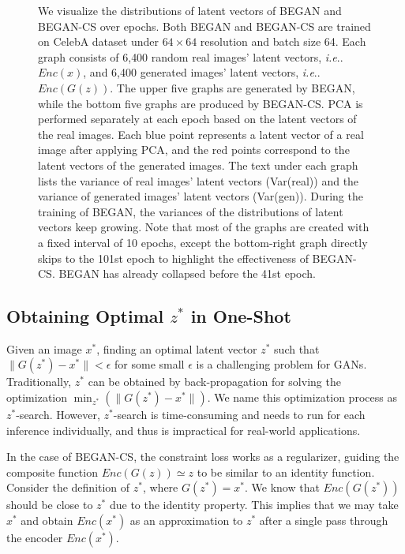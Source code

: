 \documentclass[runningheads]{llncs}
\makeatletter
\DeclareRobustCommand\onedot{\futurelet\@let@token\@onedot}
\def\@onedot{\ifx\@let@token.\else.\null\fi\xspace}
\def\ie{\emph{i.e}\onedot} \def\Ie{\emph{I.e}\onedot}
\makeatother
\begin{document}
\begin{figure}[!b]
{        }
        
        \caption{We visualize the distributions of latent vectors of BEGAN and BEGAN-CS over epochs. Both BEGAN and BEGAN-CS are trained on CelebA dataset under $64 \times 64$ resolution and batch size 64. Each graph consists of 6{,}400 random real images' latent vectors, \ie $Enc(x)$, and 6{,}400 generated images' latent vectors, \ie $Enc(G(z))$. The upper five graphs are generated by BEGAN, while the bottom five graphs are produced by BEGAN-CS. PCA is performed separately at each epoch based on the latent vectors of the real images. Each blue point represents a latent vector of a real image after applying PCA, and the red points correspond to the latent vectors of the generated images. The text under each graph lists the variance of real images' latent vectors (Var(real)) and the variance of generated images' latent vectors (Var(gen)). During the training of BEGAN, the variances of the distributions of latent vectors keep growing. Note that most of the graphs are created with a fixed interval of 10 epochs, except the bottom-right graph directly skips to the 101st epoch to highlight the effectiveness of BEGAN-CS. BEGAN has already collapsed before the 41st epoch.}\label{fig:PCA-analysis}
    \end{figure}   
   
    
    \subsection{Obtaining Optimal $z^*$ in One-Shot}
    \label{subsection:obtain-z-in-one-shot}
    
    Given an image $x^*$, finding an optimal latent vector $z^*$ such that $\lVert G(z^*)- x^* \rVert < \epsilon$ for some small $\epsilon$ is a challenging problem for GANs. Traditionally, $z^*$ can be obtained by back-propagation for solving the optimization $\displaystyle \min_{z^*} (\lVert G(z^*) - x^* \rVert)$. We name this optimization process as $z^*$-search. However, $z^*$-search is  time-consuming and needs to run for each inference individually, and thus is impractical for real-world applications.
    
    In the case of BEGAN-CS, the constraint loss works as a regularizer, guiding the composite function $Enc(G(z)) \simeq z$ to be similar to an identity function.
    Consider the definition of $z^*$, where $G(z^*) = x^*$. We know that $Enc(G(z^*))$ should be close to $z^*$ due to the identity property. This implies that we may take $x^*$ and obtain $Enc(x^*)$ as an approximation to $z^*$ after a single pass through the encoder $Enc(x^*)$.
    
\end{document}
